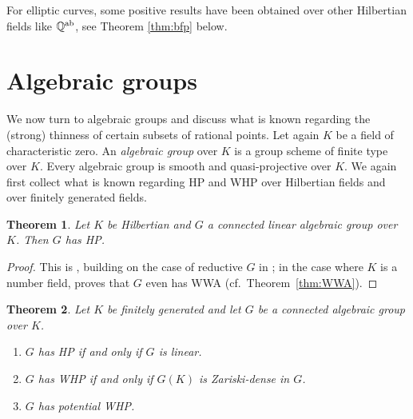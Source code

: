 \documentclass[10pt,a4paper]{amsart}
\theoremstyle{plain}
\newtheorem{theorem}{Theorem}
\theoremstyle{remark}
\numberwithin{theorem}{section}
\begin{document}
For elliptic curves, 
some positive results have been obtained over other Hilbertian fields like $\mathbb{Q}^{\rm ab}$, see Theorem \ref{thm:bfp} below.

 

\section{Algebraic groups}
\label{sec:AV}
\label{sec:algebraic_groups}  

\noindent
We now turn to algebraic groups
and discuss what is known regarding the (strong) thinness of certain subsets of rational points.
Let again $K$ be a field of characteristic zero.
An \emph{algebraic group} over $K$ is a group scheme of finite type over $K$. Every algebraic group is smooth and quasi-projective over $K$. 
We again first collect what is known regarding HP and WHP
over Hilbertian fields and over finitely generated fields.
 
 \begin{theorem}\label{thm:alg_groups_1}
     Let $K$ be Hilbertian and $G$ a connected  linear algebraic group over $K$.
     Then $G$ has HP.
 \end{theorem}
 
 \begin{proof}
This is \cite[Theorem 4.2]{BFP}, building on the case of reductive $G$ in \cite[Cor.~7.15]{CTS};
in the case where $K$ is a number field,
\cite[Cor.~3.5(ii)]{Sansuc} proves that $G$ even has WWA (cf.~Theorem~\ref{thm:WWA}).
 \end{proof}

\begin{theorem}\label{thm:alg_groups_2}
Let $K$ be finitely generated 
and let $G$ be a connected algebraic group over $K$.
\begin{enumerate}
  \item $G$ has HP if and only if $G$ is linear.
  \item $G$ has WHP if and only if $G(K)$ is Zariski-dense in $G$.
  \item $G$ has potential WHP.
\end{enumerate}
\end{theorem}
\end{document}
